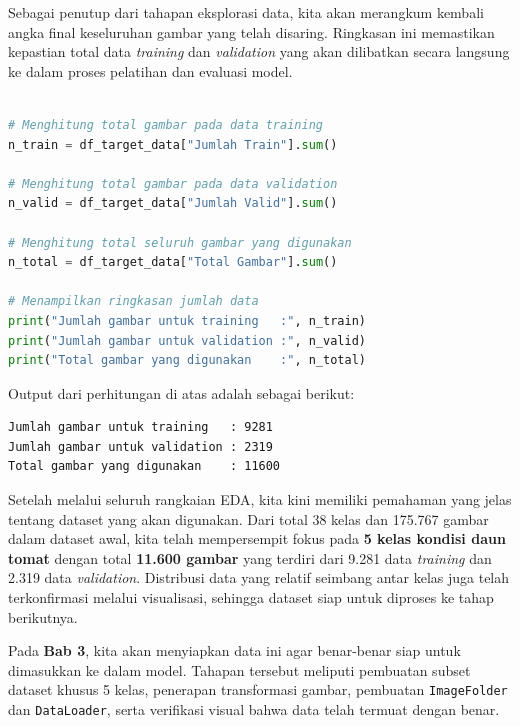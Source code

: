 Sebagai penutup dari tahapan eksplorasi data, kita akan merangkum kembali angka final keseluruhan gambar yang telah disaring. Ringkasan ini memastikan kepastian total data \textit{training} dan \textit{validation} yang akan dilibatkan secara langsung ke dalam proses pelatihan dan evaluasi model.

\begin{lstlisting}[language=Python, caption=Menghitung ringkasan akhir jumlah data]

# Menghitung total gambar pada data training
n_train = df_target_data["Jumlah Train"].sum()

# Menghitung total gambar pada data validation
n_valid = df_target_data["Jumlah Valid"].sum()

# Menghitung total seluruh gambar yang digunakan
n_total = df_target_data["Total Gambar"].sum()

# Menampilkan ringkasan jumlah data
print("Jumlah gambar untuk training   :", n_train)
print("Jumlah gambar untuk validation :", n_valid)
print("Total gambar yang digunakan    :", n_total)
\end{lstlisting}

Output dari perhitungan di atas adalah sebagai berikut:

\begin{outputcode}[H]
\begin{lstlisting}[language={}]
Jumlah gambar untuk training   : 9281
Jumlah gambar untuk validation : 2319
Total gambar yang digunakan    : 11600
\end{lstlisting}
\caption{Output ringkasan akhir data}
\end{outputcode}

Setelah melalui seluruh rangkaian EDA, kita kini memiliki pemahaman yang jelas tentang dataset yang akan digunakan. Dari total 38 kelas dan 175.767 gambar dalam dataset awal, kita telah mempersempit fokus pada \textbf{5 kelas kondisi daun tomat} dengan total \textbf{11.600 gambar} yang terdiri dari 9.281 data \textit{training} dan 2.319 data \textit{validation}. Distribusi data yang relatif seimbang antar kelas juga telah terkonfirmasi melalui visualisasi, sehingga dataset siap untuk diproses ke tahap berikutnya.

Pada \textbf{Bab 3}, kita akan menyiapkan data ini agar benar-benar siap untuk dimasukkan ke dalam model. Tahapan tersebut meliputi pembuatan subset dataset khusus 5 kelas, penerapan transformasi gambar, pembuatan \texttt{ImageFolder} dan \texttt{DataLoader}, serta verifikasi visual bahwa data telah termuat dengan benar.
